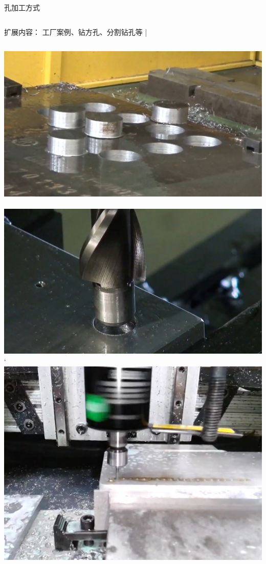 \documentclass[utf8,zihao=-4,handout,smaller,aspectratio=1610]{ctexbeamer}
\begin{document}
\begin{frame}{孔加工方式}
	\begin{columns}
		\begin{block}{扩展内容：}
			工厂案例、钻方孔、分割钻孔等
			|\end{block}
	\end{columns}
	
	\vspace{25pt}
	
	\includegraphics[width=0.3\linewidth,trim=0 0 0 0,clip,angle=0]{image/fengezuankong.jpg}~
	\includegraphics[width=0.3\linewidth,trim=0 0 0 0,clip,angle=0]{image/fukong.jpg}`
	\includegraphics[width=0.3\linewidth,trim=0 0 0 0,clip,angle=0]{image/rouxinggongsi.jpg}
	
\end{frame}
\end{document}
